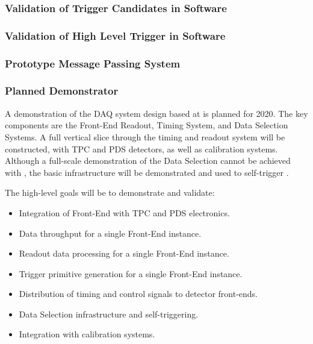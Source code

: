 \subsubsection{Validation of Trigger Candidates in Software}


\subsubsection{Validation of High Level Trigger in Software}


\subsubsection{Prototype Message Passing System}
\label{sec:fd-daq:validation-demonstrators}



\subsubsection{Planned   Demonstrator}
\label{sec:sp-daq:validation-pd-demonstrator}

A demonstration of the DAQ system design based at  is
planned for 2020. The key components are the Front-End Readout, Timing
System, and Data Selection Systems. A full vertical slice through the
timing and readout system will be constructed, with
TPC and PDS detectors, as well as calibration systems. Although a full-scale
demonstration of the Data Selection cannot be achieved with
, the basic infrastructure will be demonstrated and
used to self-trigger .

The high-level goals will be to demonstrate and validate:
\begin{itemize}
\item Integration of Front-End with TPC and PDS electronics.
\item Data throughput for a single Front-End instance.
\item Readout data processing for a single Front-End instance.
\item Trigger primitive generation for a single Front-End instance.
\item Distribution of timing and control signals to detector front-ends.
\item Data Selection infrastructure and self-triggering.
\item Integration with calibration systems.
\end{itemize}

